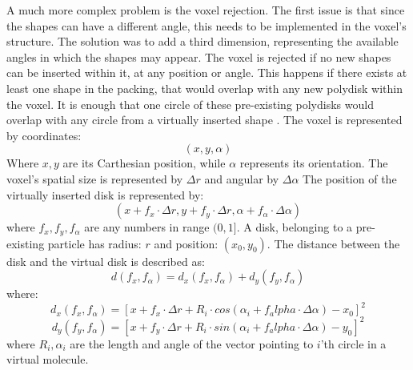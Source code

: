\documentclass[12pt, oneside]{report}
\begin{document}
A much more complex problem is the voxel rejection. The first issue is that since the shapes can have a different angle, this needs to be implemented in the voxel's structure. The solution was to add a third dimension, representing the available angles in which the shapes may appear. \newline \newline
The voxel is rejected if no new shapes can be inserted within it, at any position or angle. This happens if there exists at least one shape in the packing, that would overlap with any new polydisk within the voxel. It is enough that one circle of these pre-existing polydisks would overlap with any circle from a virtually inserted shape \cite{ciesla}. \newline \newline
The voxel is represented by coordinates:
\begin{equation*}
(x,y,\alpha)
\end{equation*}
Where $x,y$ are its Carthesian position, while $\alpha$ represents its orientation. \newline
The voxel's spatial size is represented by $\Delta r$ and angular by $\Delta \alpha$ \newline
The position of the virtually inserted disk is represented by:
\begin{equation*}
(x+f_x \cdot \Delta r, y + f_y \cdot \Delta r, \alpha + f_{\alpha} \cdot \Delta \alpha)
\end{equation*}
where $f_x,f_y,f_{\alpha}$ are any numbers in range $(0,1]$. \newline
A disk, belonging to a pre-existing particle has radius: $r$ and position: $(x_0,y_0)$. The distance between the disk and the virtual disk is described as: \newline
\begin{equation*}
d(f_x,f_{\alpha})=d_x(f_x,f_{\alpha})+d_y(f_y,f_{\alpha})
\end{equation*}
where: \newline
\begin{equation*}
d_x(f_x,f_{\alpha})=[x+f_x \cdot \Delta r + R_i \cdot cos(\alpha_i+f_alpha \cdot \Delta \alpha)-x_0]^2
\end{equation*}
\begin{equation*}
d_y(f_y,f_{\alpha})=[x+f_y \cdot \Delta r + R_i \cdot sin(\alpha_i+f_alpha \cdot \Delta \alpha)-y_0]^2
\end{equation*}
where $R_i, \alpha_i$ are the length and angle of the vector pointing to $i$'th circle in a virtual molecule. \newline
\end{document}
